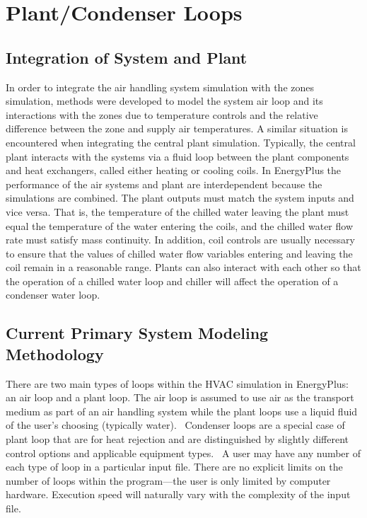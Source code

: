 \section{Plant/Condenser Loops}\label{plantcondenser-loops}

\subsection{Integration of System and Plant}\label{integration-of-system-and-plant}

In order to integrate the air handling system simulation with the zones simulation, methods were developed to model the system air loop and its interactions with the zones due to temperature controls and the relative difference between the zone and supply air temperatures. A similar situation is encountered when integrating the central plant simulation. Typically, the central plant interacts with the systems via a fluid loop between the plant components and heat exchangers, called either heating or cooling coils. In EnergyPlus the performance of the air systems and plant are interdependent because the simulations are combined. The plant outputs must match the system inputs and vice versa. That is, the temperature of the chilled water leaving the plant must equal the temperature of the water entering the coils, and the chilled water flow rate must satisfy mass continuity. In addition, coil controls are usually necessary to ensure that the values of chilled water flow variables entering and leaving the coil remain in a reasonable range. Plants can also interact with each other so that the operation of a chilled water loop and chiller will affect the operation of a condenser water loop.

\subsection{Current Primary System Modeling Methodology}\label{current-primary-system-modeling-methodology}

There are two main types of loops within the HVAC simulation in EnergyPlus: an air loop and a plant loop. The air loop is assumed to use air as the transport medium as part of an air handling system while the plant loops use a liquid fluid of the user's choosing (typically water).~ Condenser loops are a special case of plant loop that are for heat rejection and are distinguished by slightly different control options and applicable equipment types.~ A user may have any number of each type of loop in a particular input file. There are no explicit limits on the number of loops within the program---the user is only limited by computer hardware. Execution speed will naturally vary with the complexity of the input file.

